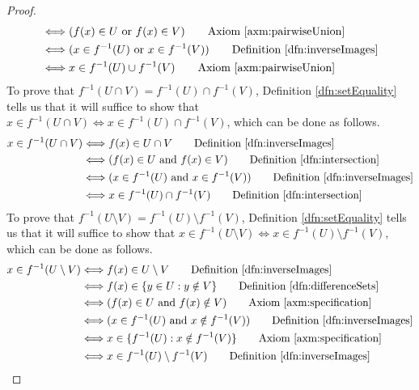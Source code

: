 \documentclass[../main.tex]{subfiles}
\begin{document}
\begin{enumerate}[ref={\thesection.\arabic*}]
\begin{proof}
\begin{align*}
            &\Longleftrightarrow (f(x)\in U\text{ or }f(x)\in V) \tag*{Axiom \ref{axm:pairwiseUnion}}\\
            &\Longleftrightarrow (x\in f^{-1}(U)\text{ or }x\in f^{-1}(V)) \tag*{Definition \ref{dfn:inverseImages}}\\
            &\Longleftrightarrow x\in f^{-1}(U)\cup f^{-1}(V) \tag*{Axiom \ref{axm:pairwiseUnion}}
        \end{align*}
        To prove that $f^{-1}(U\cap V)=f^{-1}(U)\cap f^{-1}(V)$, Definition \ref{dfn:setEquality} tells us that it will suffice to show that $x\in f^{-1}(U\cap V) \Longleftrightarrow x\in f^{-1}(U)\cap f^{-1}(V)$, which can be done as follows.
        \begin{align*}
            x\in f^{-1}(U\cap V) &\Longleftrightarrow f(x)\in U\cap V \tag*{Definition \ref{dfn:inverseImages}}\\
            &\Longleftrightarrow (f(x)\in U\text{ and }f(x)\in V) \tag*{Definition \ref{dfn:intersection}}\\
            &\Longleftrightarrow (x\in f^{-1}(U)\text{ and }x\in f^{-1}(V)) \tag*{Definition \ref{dfn:inverseImages}}\\
            &\Longleftrightarrow x\in f^{-1}(U)\cap f^{-1}(V) \tag*{Definition \ref{dfn:intersection}}
        \end{align*}
        To prove that $f^{-1}(U\setminus V)=f^{-1}(U)\setminus f^{-1}(V)$, Definition \ref{dfn:setEquality} tells us that it will suffice to show that $x\in f^{-1}(U\setminus V) \Longleftrightarrow x\in f^{-1}(U)\setminus f^{-1}(V)$, which can be done as follows.
        \begin{align*}
            x\in f^{-1}(U\setminus V) &\Longleftrightarrow f(x)\in U\setminus V \tag*{Definition \ref{dfn:inverseImages}}\\
            &\Longleftrightarrow f(x)\in\{y\in U:y\notin V\} \tag*{Definition \ref{dfn:differenceSets}}\\
            &\Longleftrightarrow (f(x)\in U\text{ and }f(x)\notin V) \tag*{Axiom \ref{axm:specification}}\\
            &\Longleftrightarrow (x\in f^{-1}(U)\text{ and }x\notin f^{-1}(V)) \tag*{Definition \ref{dfn:inverseImages}}\\
            &\Longleftrightarrow x\in\{f^{-1}(U):x\notin f^{-1}(V)\} \tag*{Axiom \ref{axm:specification}}\\
            &\Longleftrightarrow x\in f^{-1}(U)\setminus f^{-1}(V) \tag*{Definition \ref{dfn:inverseImages}}

\end{align*}
\end{proof}
\end{enumerate}
\end{document}
